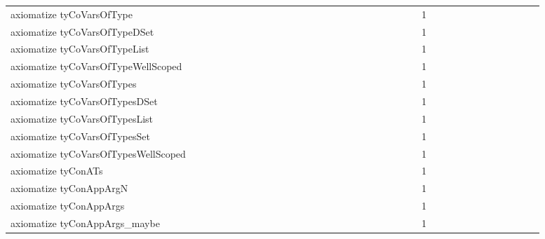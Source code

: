 {\begin{tabular}{l|rrr|rrr|rrr}
axiomatize tyCoVarsOfType &  &  &  &  &  &  &  &  &  &  &  &  &  &  &  &  &  &  &  &  &  &  &  & 1 &  &  &  &  &  &  &  &  &  &  &  & \\
axiomatize tyCoVarsOfTypeDSet &  &  &  &  &  &  &  &  &  &  &  &  &  &  &  &  &  &  &  &  &  &  &  & 1 &  &  &  &  &  &  &  &  &  &  &  & \\
axiomatize tyCoVarsOfTypeList &  &  &  &  &  &  &  &  &  &  &  &  &  &  &  &  &  &  &  &  &  &  &  & 1 &  &  &  &  &  &  &  &  &  &  &  & \\
axiomatize tyCoVarsOfTypeWellScoped &  &  &  &  &  &  &  &  &  &  &  &  &  &  &  &  &  &  &  &  &  &  &  & 1 &  &  &  &  &  &  &  &  &  &  &  & \\
axiomatize tyCoVarsOfTypes &  &  &  &  &  &  &  &  &  &  &  &  &  &  &  &  &  &  &  &  &  &  &  & 1 &  &  &  &  &  &  &  &  &  &  &  & \\
axiomatize tyCoVarsOfTypesDSet &  &  &  &  &  &  &  &  &  &  &  &  &  &  &  &  &  &  &  &  &  &  &  & 1 &  &  &  &  &  &  &  &  &  &  &  & \\
axiomatize tyCoVarsOfTypesList &  &  &  &  &  &  &  &  &  &  &  &  &  &  &  &  &  &  &  &  &  &  &  & 1 &  &  &  &  &  &  &  &  &  &  &  & \\
axiomatize tyCoVarsOfTypesSet &  &  &  &  &  &  &  &  &  &  &  &  &  &  &  &  &  &  &  &  &  &  &  & 1 &  &  &  &  &  &  &  &  &  &  &  & \\
axiomatize tyCoVarsOfTypesWellScoped &  &  &  &  &  &  &  &  &  &  &  &  &  &  &  &  &  &  &  &  &  &  &  & 1 &  &  &  &  &  &  &  &  &  &  &  & \\
axiomatize tyConATs &  &  &  &  &  &  &  &  &  &  &  &  &  &  &  &  &  &  &  &  &  &  &  & 1 &  &  &  &  &  &  &  &  &  &  &  & \\
axiomatize tyConAppArgN &  &  &  &  &  &  &  &  &  &  &  &  &  &  &  &  &  &  &  &  &  &  &  & 1 &  &  &  &  &  &  &  &  &  &  &  & \\
axiomatize tyConAppArgs &  &  &  &  &  &  &  &  &  &  &  &  &  &  &  &  &  &  &  &  &  &  &  & 1 &  &  &  &  &  &  &  &  &  &  &  & \\
axiomatize tyConAppArgs_maybe &  &  &  &  &  &  &  &  &  &  &  &  &  &  &  &  &  &  &  &  &  &  &  & 1 &  &  &  &  &  &  &  &  &  &  &  & \\

\end{tabular}}
